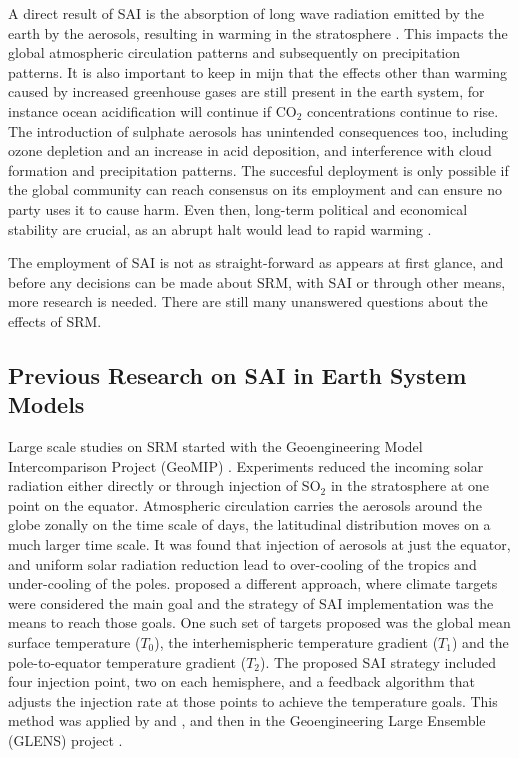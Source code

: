 A direct result of SAI is the absorption of long wave radiation emitted by the earth by the aerosols, resulting in warming in the stratosphere \parencite{Ammann2010}. This impacts the global atmospheric circulation patterns and subsequently on precipitation patterns. It is also important to keep in mijn that the effects other than warming caused by increased greenhouse gases are still present in the earth system, for instance ocean acidification will continue if CO$_2$ concentrations continue to rise. The introduction of sulphate aerosols has unintended consequences too, including ozone depletion and an increase in acid deposition, and interference with cloud formation and precipitation patterns. The succesful deployment is only possible if the global community can reach consensus on its employment and can ensure no party uses it to cause harm. Even then, long-term political and economical stability are crucial, as an abrupt halt would lead to rapid warming \textcite{robock2009}. 

The employment of SAI is not as straight-forward as appears at first glance, and before any decisions can be made about SRM, with SAI or through other means, more research is needed. There are still many unanswered questions about the effects of SRM. 

\subsection{Previous Research on SAI in Earth System Models}
Large scale studies on SRM started with the Geoengineering Model Intercomparison Project (GeoMIP) \parencite{geomip2011}. Experiments reduced the incoming solar radiation either directly or through injection of SO$_2$ in the stratosphere at one point on the equator. Atmospheric circulation carries the aerosols around the globe zonally on the time scale of days, the latitudinal distribution moves on a much larger time scale. 
It was found that injection of aerosols at just the equator, and uniform solar radiation reduction lead to over-cooling of the tropics and under-cooling of the poles. \textcite{kravitz2016} proposed a different approach, where climate targets were considered the main goal and the strategy of SAI implementation was the means to reach those goals. One such set of targets proposed was the global mean surface temperature ($T_0$), the interhemispheric temperature gradient ($T_1$) and the pole-to-equator temperature gradient ($T_2$). The proposed SAI strategy included four injection point, two on each hemisphere, and a feedback algorithm that adjusts the injection rate at those points to achieve the temperature goals. This method was applied by \textcite{kravitz2017} and \textcite{macmartin2017}, and then in the Geoengineering Large Ensemble (GLENS) project \parencite{tilmes2018}. 

